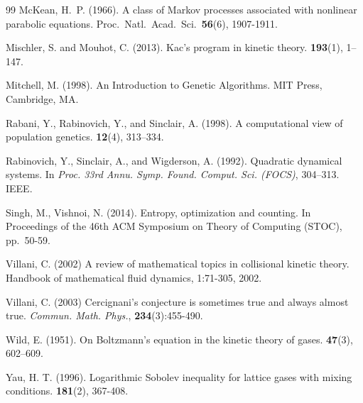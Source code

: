 \documentclass[11pt,reqno]{amsart}
\numberwithin{equation}{section}
\numberwithin{figure}{section}
\newcommand{\1}{\mathds{1}}
\begin{document}
\begin{thebibliography}{99}
 McKean, H.~P. (1966).
\newblock A class of Markov processes associated with nonlinear parabolic equations. 
\newblock Proc.\ Natl.\ Acad.\ Sci.\ {\bf 56}(6), 1907-1911.

Mischler, S. and Mouhot, C. (2013).
\newblock Kac's program in kinetic theory.
 {\bf 193}(1), 1--147.

Mitchell, M. (1998).
\newblock An Introduction to Genetic Algorithms. 
\newblock MIT Press, Cambridge, MA.

Rabani, Y., Rabinovich, Y., and Sinclair, A. (1998).
\newblock A computational view of population genetics.
 {\bf 12}(4), 313--334.

Rabinovich, Y., Sinclair, A., and Wigderson, A. (1992).
\newblock Quadratic dynamical systems.
\newblock In {\em Proc. 33rd Annu. Symp. Found. Comput. Sci. (FOCS)}, 304--313. IEEE.


Singh, M., Vishnoi, N. (2014).
\newblock Entropy, optimization and counting. 
\newblock In Proceedings of the 46th ACM Symposium
on Theory of Computing (STOC), pp.\ 50-59.


Villani, C. (2002)
\newblock A review of mathematical topics in collisional kinetic theory. 
\newblock Handbook of mathematical
fluid dynamics, 1:71-305, 2002.

Villani, C. (2003)
Cercignani's conjecture is sometimes true and always almost true. 
\newblock
{\em Commun. 
Math. Phys.}, {\bf 234}(3):455-490.

Wild, E. (1951).
\newblock On Boltzmann's equation in the kinetic theory of gases.
 {\bf 47}(3), 602--609.


Yau, H. T. (1996). 
\newblock 
Logarithmic Sobolev inequality for lattice gases with mixing conditions. 
 {\bf 181}(2), 367-408.

\end{thebibliography}
\end{document}
